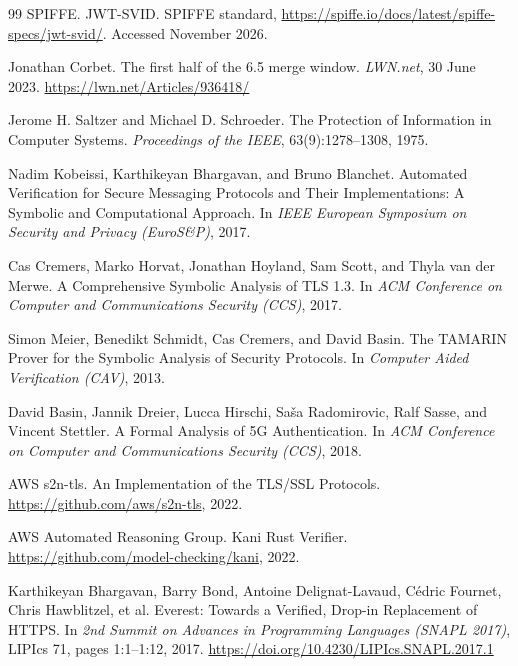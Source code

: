 \documentclass[11pt,a4paper]{article}
\theoremstyle{definition}
\begin{document}
\begin{thebibliography}{99}
SPIFFE.
\newblock JWT-SVID.
\newblock SPIFFE standard, \url{https://spiffe.io/docs/latest/spiffe-specs/jwt-svid/}. Accessed November 2026.

Jonathan Corbet.
\newblock The first half of the 6.5 merge window.
\newblock \textit{LWN.net}, 30 June 2023. \url{https://lwn.net/Articles/936418/}

Jerome H. Saltzer and Michael D. Schroeder.
\newblock The Protection of Information in Computer Systems.
\newblock \textit{Proceedings of the IEEE}, 63(9):1278--1308, 1975.

Nadim Kobeissi, Karthikeyan Bhargavan, and Bruno Blanchet.
\newblock Automated Verification for Secure Messaging Protocols and Their Implementations: A Symbolic and Computational Approach.
\newblock In \textit{IEEE European Symposium on Security and Privacy (EuroS\&P)}, 2017.

Cas Cremers, Marko Horvat, Jonathan Hoyland, Sam Scott, and Thyla van der Merwe.
\newblock A Comprehensive Symbolic Analysis of TLS 1.3.
\newblock In \textit{ACM Conference on Computer and Communications Security (CCS)}, 2017.

Simon Meier, Benedikt Schmidt, Cas Cremers, and David Basin.
\newblock The TAMARIN Prover for the Symbolic Analysis of Security Protocols.
\newblock In \textit{Computer Aided Verification (CAV)}, 2013.

David Basin, Jannik Dreier, Lucca Hirschi, Saša Radomirovic, Ralf Sasse, and Vincent Stettler.
\newblock A Formal Analysis of 5G Authentication.
\newblock In \textit{ACM Conference on Computer and Communications Security (CCS)}, 2018.

AWS s2n-tls.
\newblock An Implementation of the TLS/SSL Protocols.
\newblock \url{https://github.com/aws/s2n-tls}, 2022.

AWS Automated Reasoning Group.
\newblock Kani Rust Verifier.
\newblock \url{https://github.com/model-checking/kani}, 2022.

Karthikeyan Bhargavan, Barry Bond, Antoine Delignat-Lavaud, Cédric Fournet, Chris Hawblitzel, et al.
\newblock Everest: Towards a Verified, Drop-in Replacement of HTTPS.
\newblock In \textit{2nd Summit on Advances in Programming Languages (SNAPL 2017)}, LIPIcs 71, pages 1:1--1:12, 2017.
\newblock \url{https://doi.org/10.4230/LIPIcs.SNAPL.2017.1}


\end{thebibliography}
\end{document}

